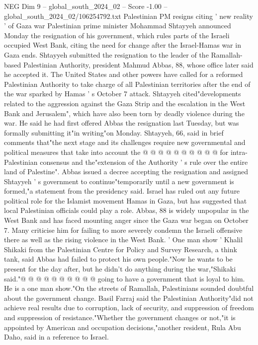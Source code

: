 \begin{textsample}{NEG Dim 9 – global\_south\_2024\_02 – Score -1.00 – global\_south\_2024\_02/106254792.txt}  \label{ex:f9_neg_361}
Palestinian PM resigns citing ' new reality ' of Gaza war Palestinian prime minister Mohammad Shtayyeh announced Monday the resignation of his government, which rules parts of the Israeli occupied West Bank, citing the need for change after the Israel-Hamas war in Gaza ends.
Shtayyeh submitted the resignation to the leader of the Ramallah-based Palestinian Authority, president Mahmud Abbas, 88, whose office later said he accepted it.
The United States and other powers have called for a reformed Palestinian Authority to take charge of all Palestinian territories after the end of the war sparked by Hamas ' s October 7 attack.
Shtayyeh cited"developments related to the aggression against the Gaza Strip and the escalation in the West Bank and Jerusalem", which have also been torn by deadly violence during the war.
He said he had first offered Abbas the resignation last Tuesday, but was formally submitting it"in writing"on Monday.
Shtayyeh, 66, said in brief comments that"the next stage and its challenges require new governmental and political measures that take into account the @ @ @ @ @ @ @ @ @ @ for intra-Palestinian consensus and the"extension of the Authority ' s rule over the entire land of Palestine".
Abbas issued a decree accepting the resignation and assigned Shtayyeh ' s government to continue"temporarily until a new government is formed,"a statement from the presidency said.
Israel has ruled out any future political role for the Islamist movement Hamas in Gaza, but has suggested that local Palestinian officials could play a role.
Abbas, 88 is widely unpopular in the West Bank and has faced mounting anger since the Gaza war began on October 7.
Many criticise him for failing to more severely condemn the Israeli offensive there as well as the rising violence in the West Bank. ' One man show ' Khalil Shikaki from the Palestinian Centre for Policy and Survey Research, a think tank, said Abbas had failed to protect his own people."Now he wants to be present for the day after, but he didn't do anything during the war,"Shikaki said."@ @ @ @ @ @ @ @ @ @ going to have a government that is loyal to him.
He is a one man show."On the streets of Ramallah, Palestinians sounded doubtful about the government change.
Basil Farraj said the Palestinian Authority"did not achieve real results due to corruption, lack of security, and suppression of freedom and suppression of resistance."Whether the government changes or not,"it is appointed by American and occupation decisions,"another resident, Rula Abu Daho, said in a reference to Israel.

\end{textsample}
